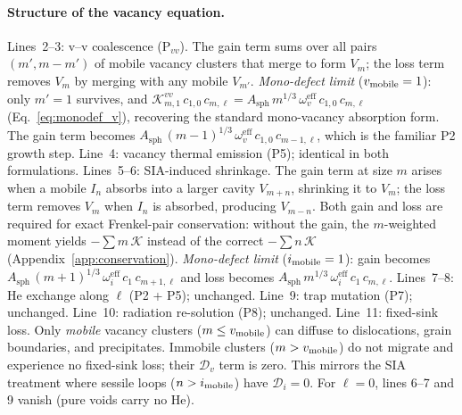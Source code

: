 \documentclass[pdflatex,sn-basic]{sn-jnl} %
\begin{document}
\paragraph{Structure of the vacancy equation.}
Lines~2--3: v--v coalescence (P$_{vv}$). The gain term sums over all
pairs $(m', m{-}m')$ of mobile vacancy clusters that merge to form
$V_m$; the loss term removes $V_m$ by merging with any mobile $V_{m'}$.
\emph{Mono-defect limit} ($v_{\rm mobile} = 1$): only $m'=1$ survives,
and $\mathcal{K}_{m,1}^{vv}\,c_{1,0}\,c_{m,\ell} =
A_{\mathrm{sph}}\,m^{1/3}\,\omega_v^{\mathrm{eff}}\,c_{1,0}\,c_{m,\ell}$
(Eq.~\ref{eq:monodef_v}), recovering the standard mono-vacancy absorption
form. The gain term becomes $A_{\mathrm{sph}}\,(m{-}1)^{1/3}\,
\omega_v^{\mathrm{eff}}\,c_{1,0}\,c_{m-1,\ell}$, which is the
familiar P2 growth step.
Line~4: vacancy thermal emission (P5); identical in both formulations.
Lines~5--6: SIA-induced shrinkage. The gain term at size $m$ arises when
a mobile $I_n$ absorbs into a larger cavity $V_{m+n}$, shrinking it to
$V_m$; the loss term removes $V_m$ when $I_n$ is absorbed, producing
$V_{m-n}$. Both gain and loss are required for exact Frenkel-pair
conservation: without the gain, the $m$-weighted moment yields $-\sum m\,
\mathcal{K}$ instead of the correct $-\sum n\,\mathcal{K}$
(Appendix~\ref{app:conservation}).
\emph{Mono-defect limit} ($i_{\rm mobile} = 1$): gain becomes
$A_{\mathrm{sph}}\,(m{+}1)^{1/3}\,\omega_i^{\mathrm{eff}}\,c_1\,c_{m+1,\ell}$
and loss becomes
$A_{\mathrm{sph}}\,m^{1/3}\,\omega_i^{\mathrm{eff}}\,c_1\,c_{m,\ell}$.
Lines~7--8: He exchange along $\ell$ (P2 + P5); unchanged.
Line~9: trap mutation (P7); unchanged.
Line~10: radiation re-solution (P8); unchanged.
Line~11: fixed-sink loss. Only \emph{mobile} vacancy clusters
($m \leq v_{\rm mobile}$) can diffuse to dislocations, grain boundaries, and
precipitates. Immobile clusters ($m > v_{\rm mobile}$) do not migrate and
experience no fixed-sink loss; their $\mathcal{D}_v$ term is zero. This
mirrors the SIA treatment where sessile loops ($n > i_{\rm mobile}$) have
$\mathcal{D}_i = 0$.
For $\ell = 0$, lines 6--7 and 9 vanish (pure voids carry no He).
\end{document}

